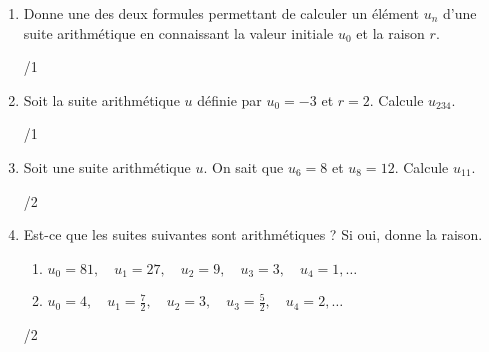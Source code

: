 	\begin{enumerate}
		\item 
			\begin{minipage}[t]{.9\textwidth}
				Donne une des deux formules permettant de calculer un élément $u_n$ d'une suite arithmétique en connaissant la valeur initiale $u_0$ et la raison $r$.
			\end{minipage}%
			\begin{minipage}{.1\textwidth}
				\begin{flushright}
					{\large /1}
				\end{flushright}
			\end{minipage}
			\vspace{3em}
			
		\item 
			\begin{minipage}[t]{.9\textwidth}
				Soit la suite arithmétique $u$ définie par $u_0 = -3$ et $r=2$. Calcule $u_{234}$.
			\end{minipage}%
			\begin{minipage}{.1\textwidth}
				\begin{flushright}
					{\large /1}
				\end{flushright}
			\end{minipage}
			\vspace{3em}
			
		\item 
			\begin{minipage}[t]{.9\textwidth}
				Soit une suite arithmétique $u$. On sait que $u_6 = 8$ et $u_8 = 12$. Calcule $u_{11}$.
			\end{minipage}%
			\begin{minipage}{.1\textwidth}
				\begin{flushright}
					{\large /2}
				\end{flushright}
			\end{minipage}
			\vspace{3em}
			
		\item 
			\begin{minipage}[t]{.9\textwidth}
				Est-ce que les suites suivantes sont arithmétiques ? Si oui, donne la raison.
				\begin{enumerate}
					\item $u_0 = 81, \quad u_1 = 27, \quad u_2 = 9, \quad u_3 = 3, \quad u_4 = 1,\dots$
					\item $u_0 = 4, \quad u_1 = \frac{7}{2}, \quad u_2 = 3, \quad u_3 = \frac{5}{2}, \quad u_4 = 2,\dots$
				\end{enumerate}
			\end{minipage}%
			\begin{minipage}{.1\textwidth}
				\begin{flushright}
					{\large /2}
				\end{flushright}
			\end{minipage}
			\vspace{3em}
			

\end{enumerate}
